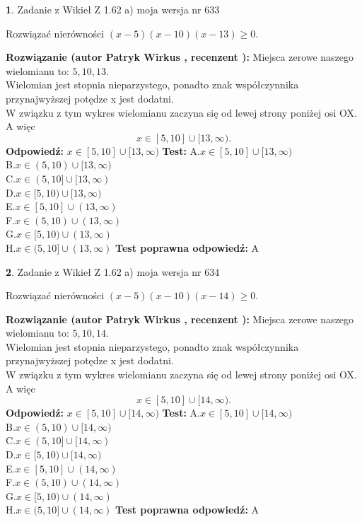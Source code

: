 \documentclass[12pt, a4paper]{article}
\theoremstyle{definition} %
\newtheorem{zad}{}
\newcommand{\zadStart}[1]{\begin{zad}#1\newline}
\newcommand{\zadStop}{\end{zad}}
\newcommand{\rozwStart}[2]{\noindent \textbf{Rozwiązanie (autor #1 , recenzent #2): }\newline}
\newcommand{\rozwStop}{\newline}
\newcommand{\odpStart}{\noindent \textbf{Odpowiedź:}\newline}
\newcommand{\odpStop}{\newline}
\newcommand{\testStart}{\noindent \textbf{Test:}\newline}
\newcommand{\testStop}{\newline}
\newcommand{\kluczStart}{\noindent \textbf{Test poprawna odpowiedź:}\newline}
\newcommand{\kluczStop}{\newline}
\begin{document}
\zadStart{Zadanie z Wikieł Z 1.62 a) moja wersja nr 633}

Rozwiązać nierówności $(x-5)(x-10)(x-13)\ge0$.
\zadStop
\rozwStart{Patryk Wirkus}{}
Miejsca zerowe naszego wielomianu to: $5, 10, 13$.\\
Wielomian jest stopnia nieparzystego, ponadto znak współczynnika przy\linebreak najwyższej potędze x jest dodatni.\\ W związku z tym wykres wielomianu zaczyna się od lewej strony poniżej osi OX. A więc $$x \in [5,10] \cup [13,\infty).$$
\rozwStop
\odpStart
$x \in [5,10] \cup [13,\infty)$
\odpStop
\testStart
A.$x \in [5,10] \cup [13,\infty)$\\
B.$x \in (5,10) \cup [13,\infty)$\\
C.$x \in (5,10] \cup [13,\infty)$\\
D.$x \in [5,10) \cup [13,\infty)$\\
E.$x \in [5,10] \cup (13,\infty)$\\
F.$x \in (5,10) \cup (13,\infty)$\\
G.$x \in [5,10) \cup (13,\infty)$\\
H.$x \in (5,10] \cup (13,\infty)$
\testStop
\kluczStart
A
\kluczStop



\zadStart{Zadanie z Wikieł Z 1.62 a) moja wersja nr 634}

Rozwiązać nierówności $(x-5)(x-10)(x-14)\ge0$.
\zadStop
\rozwStart{Patryk Wirkus}{}
Miejsca zerowe naszego wielomianu to: $5, 10, 14$.\\
Wielomian jest stopnia nieparzystego, ponadto znak współczynnika przy\linebreak najwyższej potędze x jest dodatni.\\ W związku z tym wykres wielomianu zaczyna się od lewej strony poniżej osi OX. A więc $$x \in [5,10] \cup [14,\infty).$$
\rozwStop
\odpStart
$x \in [5,10] \cup [14,\infty)$
\odpStop
\testStart
A.$x \in [5,10] \cup [14,\infty)$\\
B.$x \in (5,10) \cup [14,\infty)$\\
C.$x \in (5,10] \cup [14,\infty)$\\
D.$x \in [5,10) \cup [14,\infty)$\\
E.$x \in [5,10] \cup (14,\infty)$\\
F.$x \in (5,10) \cup (14,\infty)$\\
G.$x \in [5,10) \cup (14,\infty)$\\
H.$x \in (5,10] \cup (14,\infty)$
\testStop
\kluczStart
A
\kluczStop
\end{document}

